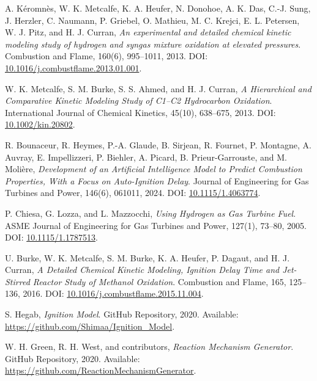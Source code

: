 \documentclass[12pt]{report}
\begin{document}
\begin{thebibliography}{9}

A. Kéromnès, W. K. Metcalfe, K. A. Heufer, N. Donohoe, A. K. Das, C.-J. Sung, J. Herzler, C. Naumann, P. Griebel, O. Mathieu, M. C. Krejci, E. L. Petersen, W. J. Pitz, and H. J. Curran,
\textit{An experimental and detailed chemical kinetic modeling study of hydrogen and syngas mixture oxidation at elevated pressures}.
Combustion and Flame, 160(6), 995--1011, 2013. DOI: \href{https://doi.org/10.1016/j.combustflame.2013.01.001}{10.1016/j.combustflame.2013.01.001}.

W. K. Metcalfe, S. M. Burke, S. S. Ahmed, and H. J. Curran,
\textit{A Hierarchical and Comparative Kinetic Modeling Study of C1--C2 Hydrocarbon Oxidation}.
International Journal of Chemical Kinetics, 45(10), 638--675, 2013. DOI: \href{https://doi.org/10.1002/kin.20802}{10.1002/kin.20802}.

R. Bounaceur, R. Heymes, P.-A. Glaude, B. Sirjean, R. Fournet, P. Montagne, A. Auvray, E. Impellizzeri, P. Biehler, A. Picard, B. Prieur-Garrouste, and M. Molière,
\textit{Development of an Artificial Intelligence Model to Predict Combustion Properties, With a Focus on Auto-Ignition Delay}.
Journal of Engineering for Gas Turbines and Power, 146(6), 061011, 2024. DOI: \href{https://doi.org/10.1115/1.4063774}{10.1115/1.4063774}.

P. Chiesa, G. Lozza, and L. Mazzocchi, 
\textit{Using Hydrogen as Gas Turbine Fuel}. 
ASME Journal of Engineering for Gas Turbines and Power, 127(1), 73--80, 2005. DOI: \href{https://doi.org/10.1115/1.1787513}{10.1115/1.1787513}.

U. Burke, W. K. Metcalfe, S. M. Burke, K. A. Heufer, P. Dagaut, and H. J. Curran,
\textit{A Detailed Chemical Kinetic Modeling, Ignition Delay Time and Jet-Stirred Reactor Study of Methanol Oxidation}.
Combustion and Flame, 165, 125--136, 2016. DOI: \href{https://doi.org/10.1016/j.combustflame.2015.11.004}{10.1016/j.combustflame.2015.11.004}.

S. Hegab, 
\textit{Ignition Model}. 
GitHub Repository, 2020. Available: \href{https://github.com/Shimaa/Ignition_Model}{https://github.com/Shimaa/Ignition\_Model}.

W. H. Green, R. H. West, and contributors, 
\textit{Reaction Mechanism Generator}. 
GitHub Repository, 2020. Available: \href{https://github.com/ReactionMechanismGenerator}{https://github.com/ReactionMechanismGenerator}.


\end{thebibliography}
\end{document}
